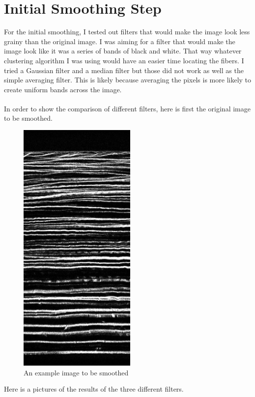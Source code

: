 \documentclass[11pt,psfig]{article}
\begin{document}
\section{Initial Smoothing Step}

For the initial smoothing, I tested out filters that would make the image look less grainy than the original image. I was aiming for a filter that would make the image look like it was a series of bands of black and white. That way whatever clustering algorithm I was using would have an easier time locating the fibers. I tried a Gaussian filter and a median filter but those did not work as well as the simple averaging filter. This is likely because averaging the pixels is more likely to create uniform bands across the image.\\
\\
In order to show the comparison of different filters, here is first the original image to be smoothed.
\begin{figure}[H]
\centering
\includegraphics[height=5in]{image1.jpg}
\caption{An example image to be smoothed}
\end{figure}
Here is a pictures of the results of the three different filters.
\end{document}
